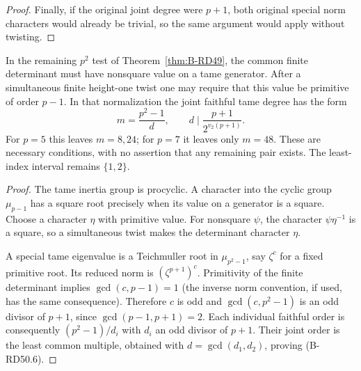 \begin{proof}
Finally, if the original joint degree were $p+1$, both original
special norm characters would already be trivial, so the same
argument would apply without twisting.
\end{proof}

\begin{corollary}
\label{cor:B-RD50-remaining}
In the remaining $p^2$ test of Theorem~\ref{thm:B-RD49}, the
common finite determinant must have nonsquare value on a tame
generator. After a simultaneous finite height-one twist one
may require that this value be primitive of order $p-1$.
In that normalization the joint faithful tame degree has the form
\[
          m=\frac{p^2-1}{d},\qquad
          d\mid\frac{p+1}{2^{v_2(p+1)}}.
                                                        \tag{B-RD50.6}
\]
For $p=5$ this leaves $m=8,24$; for $p=7$ it leaves only
$m=48$. These are necessary conditions, with no assertion that
any remaining pair exists. The least-index interval remains
$\{1,2\}$.
\end{corollary}
\begin{proof}
The tame inertia group is procyclic. A character into the cyclic
group $\mu_{p-1}$ has a square root precisely when its value on
a generator is a square. Choose a character $\eta$ with primitive
value. For nonsquare $\psi$, the character $\psi\eta^{-1}$ is
a square, so a simultaneous twist makes the determinant character
$\eta$.

A special tame eigenvalue is a Teichmuller root in
$\mu_{p^2-1}$, say $\zeta^c$ for a fixed primitive root.
Its reduced norm is $(\zeta^{p+1})^c$. Primitivity of the finite
determinant implies $\gcd(c,p-1)=1$ (the inverse norm convention,
if used, has the same consequence). Therefore $c$ is odd and
$\gcd(c,p^2-1)$ is an odd divisor of $p+1$, since
$\gcd(p-1,p+1)=2$. Each individual faithful order is consequently
$(p^2-1)/d_i$ with $d_i$ an odd divisor of $p+1$. Their joint
order is the least common multiple, obtained with
$d=\gcd(d_1,d_2)$, proving (B-RD50.6).
\end{proof}

